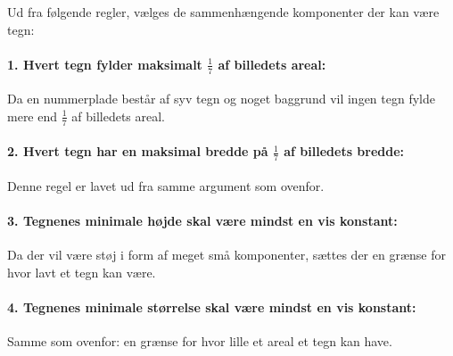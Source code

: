 



Ud fra følgende regler, vælges de sammenhængende komponenter der kan være tegn:

\paragraph{1. Hvert tegn fylder maksimalt $\frac{1}{7}$ af billedets areal:} Da en nummerplade består af syv tegn og noget baggrund vil ingen tegn fylde mere end $\frac{1}{7}$ af billedets areal. 
\paragraph{2. Hvert tegn har en maksimal bredde på $\frac{1}{7}$ af billedets bredde:} Denne regel er lavet ud fra samme argument som ovenfor.
\paragraph{3. Tegnenes minimale højde skal være mindst en vis konstant:} Da der vil være støj i form af meget små komponenter, sættes der en grænse for hvor lavt et tegn kan være.%
\paragraph{4. Tegnenes minimale størrelse skal være mindst en vis konstant:} Samme som ovenfor: en grænse for hvor lille et areal et tegn kan have.%

